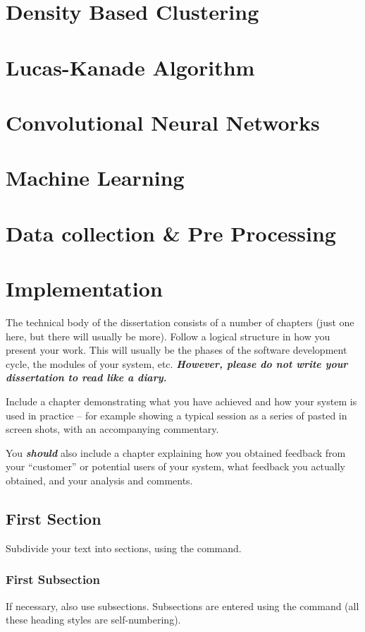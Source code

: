 \chapter{Density Based Clustering}

\chapter{Lucas-Kanade Algorithm}

\chapter{Convolutional Neural Networks}

\chapter{Machine Learning}

\chapter{Data collection \& Pre Processing}

\chapter{Implementation}
The technical body of the dissertation consists of a number of chapters (just 
one here, but there will usually be more).  Follow a logical structure in how 
you present your work.  This will usually be the phases of the software 
development cycle, the modules of your system, etc. \textbf{\textit{However, 
please do not write your dissertation to read like a diary.}}

Include a chapter demonstrating what you have achieved and how your system is 
used in practice -- for example showing a typical session as a series of pasted 
in screen shots, with an accompanying commentary.

You \textbf{\textit{should}} also include a chapter explaining how you obtained 
feedback from your ``customer'' or potential users of your system, what 
feedback you actually obtained, and your analysis and comments.

\section{First Section}
Subdivide your text into sections, using the  command.

\subsection{First Subsection}
If necessary, also use subsections. Subsections are entered using the 
 command (all these heading styles are self-numbering).

